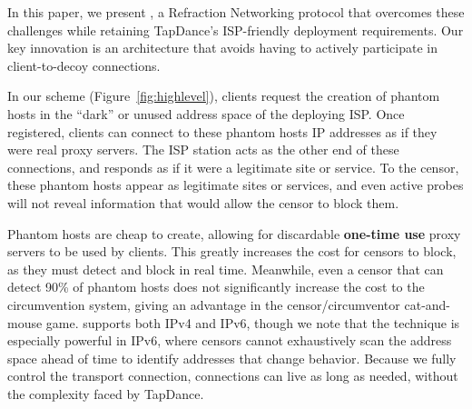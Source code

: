 \documentclass[letterpaper,twocolumn,10pt]{article}
\newcommand{\TODO}[1]{\hl{TODO: #1}\xspace}
\begin{document}
\smallskip

In this paper, we present \textbf{\scheme}, a Refraction
Networking protocol that overcomes these challenges while retaining
TapDance's ISP-friendly deployment requirements.
Our key innovation is an architecture that avoids
having to actively participate in client-to-decoy connections.

In our scheme (Figure~\ref{fig:highlevel}), clients
request the creation of phantom hosts in the ``dark''
or unused address space of the deploying ISP. Once registered, clients
can connect to these phantom hosts IP addresses as if they were real
proxy servers. The ISP station acts as the other end of these connections, and
responds as if it were a legitimate site or service. To the censor,
these phantom hosts appear as legitimate sites or services, and even
active probes will not reveal information that would allow the censor to
block them.



Phantom hosts are cheap to create, allowing for discardable \textbf{one-time use}
proxy servers to be used by clients. This greatly increases the cost for censors to
block, as they must detect and block in real time. Meanwhile, even a censor that
can detect 90\% of phantom hosts does not significantly increase the cost to the
circumvention system, giving \scheme an advantage in the censor/circumventor
cat-and-mouse game.
\scheme supports both IPv4 and IPv6, though we note that the technique is especially
powerful in IPv6, where censors cannot exhaustively scan the address space
ahead of time to identify addresses that change behavior.
Because we fully control the transport connection, connections can live as
long as needed, without the complexity faced by TapDance.

\end{document}
